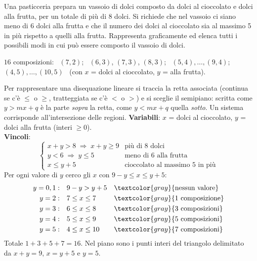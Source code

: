 \begin{question}[ID=2.2, subtitle={Composizione di un vassoio di dolci}, tags={parti di piano}, difficulty=media]
Una pasticceria prepara un vassoio di dolci composto da dolci al cioccolato e dolci alla frutta, per un totale di più di 8 dolci.
Si richiede che nel vassoio ci siano meno di 6 dolci alla frutta e che il numero dei dolci al cioccolato sia al massimo 5 in più rispetto a quelli alla frutta.
Rappresenta graficamente ed elenca tutti i possibili modi in cui può essere composto il vassoio di dolci.
\begin{solution}
$16$ composizioni: \ $(7,2)$; \ $(6,3)$, $(7,3)$, $(8,3)$; \ $(5,4),\dots,(9,4)$; \ $(4,5),\dots,(10,5)$ \ (con $x$ = dolci al cioccolato, $y$ = alla frutta).
\end{solution}
\begin{explanation}
Per rappresentare una disequazione lineare si traccia la retta associata (continua se c'è $\leq$ o $\geq$, tratteggiata se c'è $<$ o $>$) e si sceglie il semipiano: scritta come $y>mx+q$ è la parte \emph{sopra} la retta, come $y<mx+q$ quella \emph{sotto}. Un sistema corrisponde all'intersezione delle regioni.
\textbf{Variabili}: $x$ = dolci al cioccolato, $y$ = dolci alla frutta (interi $\geq0$). \\
\textbf{Vincoli}:
\[ \begin{cases} x+y>8 \;\Rightarrow\; x+y\geq9 & \text{più di 8 dolci}\\ y<6 \;\Rightarrow\; y\leq5 & \text{meno di 6 alla frutta}\\ x\leq y+5 & \text{cioccolato al massimo 5 in più} \end{cases} \]
Per ogni valore di $y$ cerco gli $x$ con $9-y\leq x\leq y+5$:
\[\begin{aligned}
y=0,1: &\quad 9-y>y+5 && \textcolor{gray}{\text{nessun valore}}\\
y=2: &\quad 7\leq x\leq7 && \textcolor{gray}{\text{1 composizione}}\\
y=3: &\quad 6\leq x\leq8 && \textcolor{gray}{\text{3 composizioni}}\\
y=4: &\quad 5\leq x\leq9 && \textcolor{gray}{\text{5 composizioni}}\\
y=5: &\quad 4\leq x\leq10 && \textcolor{gray}{\text{7 composizioni}}
\end{aligned}\]
Totale $1+3+5+7=16$. Nel piano sono i punti interi del triangolo delimitato da $x+y=9$, $x=y+5$ e $y=5$.
\end{explanation}
\end{question}
